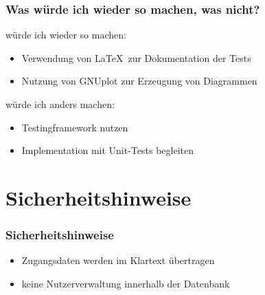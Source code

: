 \documentclass{beamer}
\begin{document}
\begin{frame}
  \frametitle{Was würde ich wieder so machen, was nicht?}

  würde ich wieder so machen:
  \begin{itemize}
  \item Verwendung von \LaTeX \, zur Dokumentation der Tests
  \item Nutzung von GNUplot zur Erzeugung von Diagrammen
  \end{itemize}
  \vspace{0.5cm}

  würde ich anders machen:
  \begin{itemize}
  \item Testingframework nutzen
  \item Implementation mit Unit-Tests begleiten
  \end{itemize}
\end{frame}

\section{Sicherheitshinweise}
\begin{frame}
  \frametitle{Sicherheitshinweise}
  \begin{itemize}
    \item Zugangsdaten werden im Klartext übertragen
    \item keine Nutzerverwaltung innerhalb der Datenbank
  \end{itemize}
\end{frame}
\end{document}
